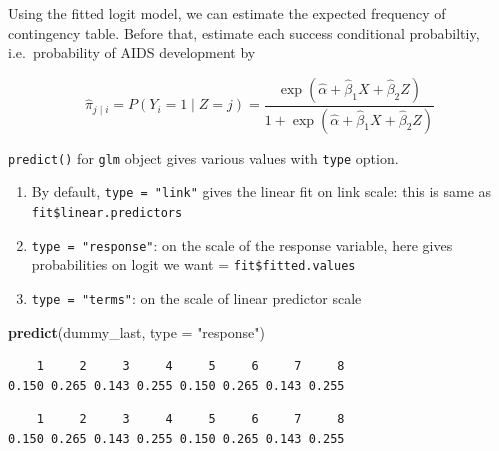 \documentclass[]{book}
\newenvironment{Shaded}{\begin{snugshade}}{\end{snugshade}}
\newcommand{\DataTypeTok}[1]{\textcolor[rgb]{0.13,0.29,0.53}{#1}}
\newcommand{\KeywordTok}[1]{\textcolor[rgb]{0.13,0.29,0.53}{\textbf{#1}}}
\newcommand{\NormalTok}[1]{#1}
\newcommand{\OperatorTok}[1]{\textcolor[rgb]{0.81,0.36,0.00}{\textbf{#1}}}
\newcommand{\StringTok}[1]{\textcolor[rgb]{0.31,0.60,0.02}{#1}}
\providecommand{\tightlist}{%
  \setlength{\itemsep}{0pt}\setlength{\parskip}{0pt}}
\begin{document}
Using the fitted logit model, we can estimate the expected frequency of contingency table. Before that, estimate each success conditional probabiltiy, i.e.~probability of AIDS development by

\[\hat\pi_{j \mid i} = P(Y_i = 1 \mid Z = j) = \frac{\exp(\hat\alpha + \hat\beta_1X + \hat\beta_2Z)}{1 + \exp(\hat\alpha + \hat\beta_1X + \hat\beta_2Z)}\]

\texttt{predict()} for \texttt{glm} object gives various values with \texttt{type} option.

\begin{enumerate}
\def\labelenumi{\arabic{enumi}.}
\tightlist
\item
  By default, \texttt{type\ =\ "link"} gives the linear fit on link scale: this is same as \texttt{fit\$linear.predictors}
\item
  \texttt{type\ =\ "response"}: on the scale of the response variable, here gives probabilities on logit we want = \texttt{fit\$fitted.values}
\item
  \texttt{type\ =\ "terms"}: on the scale of linear predictor scale
\end{enumerate}

\begin{Shaded}
\begin{Highlighting}[]
\KeywordTok{predict}\NormalTok{(dummy_last, }\DataTypeTok{type =} \StringTok{"response"}\NormalTok{)}
\end{Highlighting}
\end{Shaded}

\begin{verbatim}
    1     2     3     4     5     6     7     8 
0.150 0.265 0.143 0.255 0.150 0.265 0.143 0.255 
\end{verbatim}

\begin{Shaded}
\end{Shaded}

\begin{verbatim}
    1     2     3     4     5     6     7     8 
0.150 0.265 0.143 0.255 0.150 0.265 0.143 0.255 
\end{verbatim}
\end{document}
